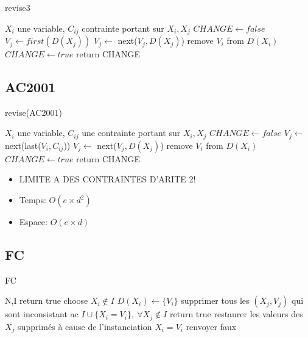 \documentclass[a4paper,)11pt]{article}
\begin{document}
\begin{algorithm}[!h]
\caption{revise3}
\label{R3}
\begin{algorithmic}
\REQUIRE $X_i$ une variable, $C_{ij}$ contrainte portant sur $X_i,X_j$
\STATE $CHANGE \leftarrow false$
\STATE $V_j \leftarrow first(D(X_j))$
\STATE $V_j \leftarrow$ next($V_j, D(X_j)$)
\ENDWHILE
{}
\STATE remove $V_i$ from $D(X_i)$
\STATE $CHANGE \leftarrow true$
\ENDIF
\ENDFOR
\STATE return CHANGE
\end{algorithmic}
\end{algorithm}


\subsection{AC2001}

\begin{algorithm}[!h]
\caption{revise(AC2001)}
\label{R2001}
\begin{algorithmic}
\REQUIRE $X_i$ une variable, $C_{ij}$ une contrainte portant sur $X_i,X_j$
\STATE $CHANGE \leftarrow false$
\STATE $V_j \leftarrow$ next(last($V_i, C_{ij} $))
\STATE $V_j \leftarrow$ next($V_j, D(X_j)$)
\ENDWHILE
{}
\STATE remove $V_i$ from $D(X_i)$
\STATE $CHANGE \leftarrow true$
\ENDIF
\ENDFOR
\STATE return CHANGE
\end{algorithmic}
\end{algorithm}

\begin{itemize}
	\item LIMITE A DES CONTRAINTES D'ARITE 2!
	\item Temps: $O(e\times d^2)$
	\item Espace: $O(e\times d)$
\end{itemize}

\subsection{FC}

\begin{algorithm}[!h]
\caption{FC}
\label{FC}
\begin{algorithmic}
\REQUIRE N,I
\STATE return true
\ELSE
\STATE choose $X_i \notin I$
\STATE $D(X_i) \leftarrow \{V_i\}$
\STATE supprimer tous les $(X_j,V_j)$ qui sont inconsistant ac $I \cup \{X_i=V_i\},\ \forall X_j \notin I$
\STATE return true
\ENDIF
\ENDIF
\STATE restaurer les valeurs des $X_j$ supprimés à cause de l'instanciation $X_i=V_i$
\ENDFOR
\ENDIF
\STATE renvoyer faux
\end{algorithmic}
\end{algorithm}
\end{document}
